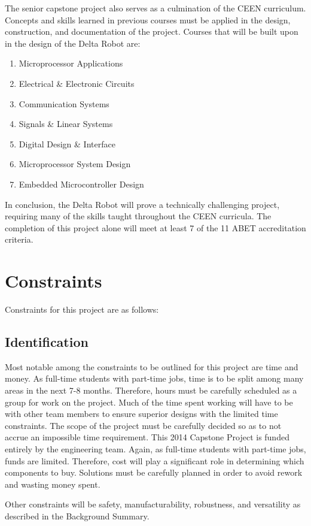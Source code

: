 \documentclass[11pt]{report}
\begin{document}
The senior capstone project also serves as a culmination of the CEEN curriculum. Concepts and skills learned in previous courses must be applied in the design, construction, and documentation of the project.
Courses that will be built upon in the design of the Delta Robot are:
\begin{enumerate} \parskip2pt
	\item Microprocessor Applications
	\item Electrical \& Electronic Circuits
	\item Communication Systems
	\item Signals \& Linear Systems
	\item Digital Design \& Interface
	\item Microprocessor System Design
	\item Embedded Microcontroller Design
\end{enumerate}

In conclusion, the Delta Robot will prove a technically challenging project, requiring many of the skills taught throughout the CEEN curricula.
The completion of this project alone will meet at least 7 of the 11 ABET accreditation criteria.

\section{Constraints}	
Constraints for this project are as follows:

\subsection{Identification}
Most notable among the constraints to be outlined for this project are time and money.
As full-time students with part-time jobs, time is to be split among many areas in the next 7-8 months.
Therefore, hours must be carefully scheduled as a group for work on the project.
Much of the time spent working will have to be with other team members to ensure superior designs with the limited time constraints.
The scope of the project must be carefully decided so as to not accrue an impossible time requirement. 
This 2014 Capstone Project is funded entirely by the engineering team. 
Again, as full-time students with part-time jobs, funds are limited.
Therefore, cost will play a significant role in determining which components to buy.
Solutions must be carefully planned in order to avoid rework and wasting money spent.

Other constraints will be safety, manufacturability, robustness, and versatility as described in the Background Summary.
\end{document}

